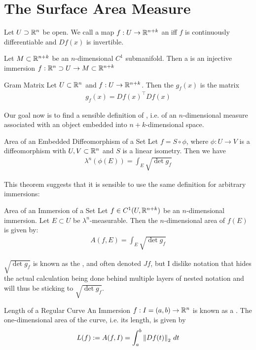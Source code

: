 \section{The Surface Area Measure}
\begin{definition}
	Let $U \supset \mathbb{R}^n$ be open. We call a map $f : U \to \mathbb{R}^{n+k}$ an  iff $f$ is continuously differentiable and $ Df(x)$ is invertible.
\end{definition}
\begin{definition}
	Let $M \subset \mathbb{R}^{n+k}$ be an $n$-dimensional $C^1$ submanifold. Then a  is an injective immersion $f : \mathbb{R}^n \supset U \to M \subset \mathbb{R}^{n+k}$
\end{definition}
\begin{importantdefinition}{Gram Matrix}{}
	Let $U \subset \mathbb{R}^n$ and $f : U \to \mathbb{R}^{n+k}$. Then the  $g_f(x)$ is the matrix
	\begin{align*}
		g_f(x) = Df(x)^\top Df(x)
	\end{align*}
\end{importantdefinition}
Our goal now is to find a sensible definition of , i.e. of an $n$-dimensional measure associated with an object embedded into $n+k$-dimensional space.
\begin{importantcorollary}{Area of an Embedded Diffeomorphism of a Set}{}
	Let $f = S \circ \phi$, where $\phi : U \to V$ is a diffeomorphism with $U,V \subset \mathbb{R}^n$ and $S$ is a linear isometry. Then we have
	\begin{align*}
		\lambda^n(\phi(E)) = \int_E \sqrt{\det g_f}
	\end{align*}
\end{importantcorollary}
This theorem suggests that it is sensible to use the same definition for arbitrary immersions:
\begin{importantdefinition}{Area of an Immersion of a Set}{}
	Let $f \in C^1(U, \mathbb{R}^{n+k})$ be an $n$-dimensional immersion. Let $E \subset U$ be $\lambda^n$-measurable. Then the $n$-dimensional area of $f(E)$ is given by:
	\begin{align*}
		A(f,E) = \int_E \sqrt{\det g_f}
	\end{align*}
\end{importantdefinition}
$\sqrt{\det g_f}$ is known as the , and often denoted $Jf$, but I dislike notation that hides the actual calculation being done behind multiple layers of nested notation and will thus be sticking to $\sqrt{\det g_f}$.
\begin{importantcorollary}{Length of a Regular Curve}{}
	An Immersion $f : I = (a,b) \to \mathbb{R}^n$ is known as a . The one-dimensional area of the curve, i.e. its length, is given by
	\begin{align*}
		L(f) := A(f,I) = \int_a^b \norm{Df(t)}_2 ~dt
	\end{align*}
\end{importantcorollary}

